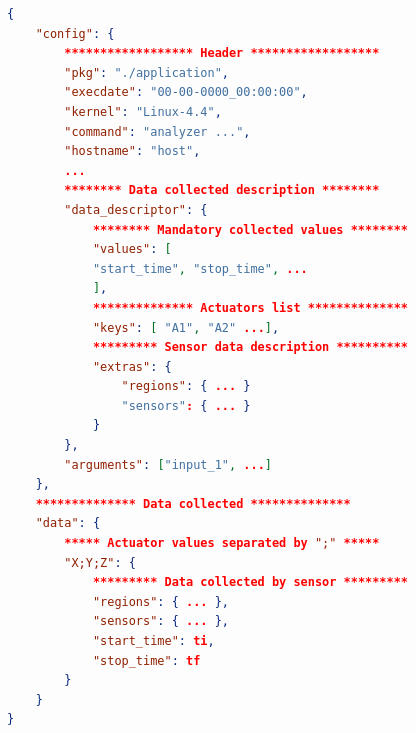 \lstset{style=jsonstyle, frame=tb}
\begin{lstlisting}[label={lst:datafile}, language=json, caption={Sample of exported data file showing the internal structure and organization of the data.}]
{
	"config": {
		****************** Header ******************
		"pkg": "./application", 
		"execdate": "00-00-0000_00:00:00",
		"kernel": "Linux-4.4",
		"command": "analyzer ...",
		"hostname": "host",
		...
		******** Data collected description ********
		"data_descriptor": {
			******** Mandatory collected values ********
			"values": [ 
			"start_time", "stop_time", ... 
			],
			************** Actuators list **************
			"keys": [ "A1", "A2" ...],
			********* Sensor data description **********
			"extras": {
				"regions": { ... }
				"sensors": { ... }
			}
		},
		"arguments": ["input_1", ...]
	},
	************** Data collected **************
	"data": {
		***** Actuator values separated by ";" *****
		"X;Y;Z": {
			********* Data collected by sensor *********
			"regions": { ... },
			"sensors": { ... },
			"start_time": ti,
			"stop_time": tf
		}
	}
}
\end{lstlisting}